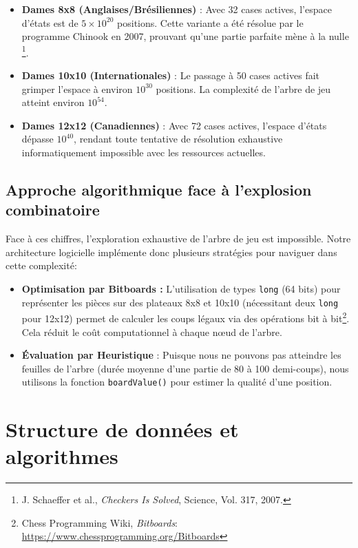 \documentclass[11pt,a4paper]{article}
\begin{document}
\begin{itemize}
    \item \textbf{Dames 8x8 (Anglaises/Brésiliennes)} : Avec 32 cases actives, l'espace d'états est de $5 \times 10^{20}$ positions. Cette variante a été résolue par le programme Chinook en 2007, prouvant qu'une partie parfaite mène à la nulle \footnote{J. Schaeffer et al., \textit{Checkers Is Solved}, Science, Vol. 317, 2007.}.
    \item \textbf{Dames 10x10 (Internationales)} : Le passage à 50 cases actives fait grimper l'espace à environ $10^{30}$ positions. La complexité de l'arbre de jeu atteint environ $10^{54}$.
    \item \textbf{Dames 12x12 (Canadiennes)} : Avec 72 cases actives, l'espace d'états dépasse $10^{40}$, rendant toute tentative de résolution exhaustive informatiquement impossible avec les ressources actuelles.
\end{itemize}



\subsection{Approche algorithmique face à l'explosion combinatoire}

Face à ces chiffres, l'exploration exhaustive de l'arbre de jeu est impossible. Notre architecture logicielle implémente donc plusieurs stratégies pour naviguer dans cette complexité:

\begin{itemize}
    \item \textbf{Optimisation par Bitboards :} L'utilisation de types \texttt{long} (64 bits) pour représenter les pièces sur des plateaux 8x8 et 10x10 (nécessitant deux \texttt{long} pour 12x12) permet de calculer les coups légaux via des opérations bit à bit\footnote{Chess Programming Wiki, \textit{Bitboards}: \url{https://www.chessprogramming.org/Bitboards}}. Cela réduit le coût computationnel à chaque nœud de l'arbre.
    \item \textbf{Évaluation par Heuristique} : Puisque nous ne pouvons pas atteindre les feuilles de l'arbre (durée moyenne d'une partie de 80 à 100 demi-coups), nous utilisons la fonction \texttt{boardValue()} pour estimer la qualité d'une position.
\end{itemize}


\section{Structure de données et algorithmes}
\end{document}
